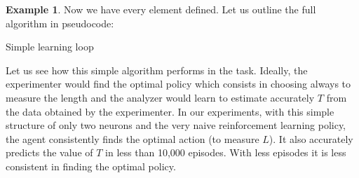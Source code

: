 \documentclass[11pt,a4paper,twoside]{report}
\DeclareMathOperator*{\argmax}{arg\,max}
\newcommand{\+}{\textnormal{+} }
\theoremstyle{definition}
\newtheorem{myex}[mythm]{Example}
\numberwithin{equation}{chapter}
\begin{document}
\begin{myex}
Now we have every element defined. Let us outline the full algorithm in 
pseudocode:

  \makeatletter
  \def\BState{\State\hskip-\ALG@thistlm}
  \makeatother
  \begin{algorithm}
    \caption{Simple learning loop}\label{pendulum}
    \end{algorithm}
\end{myex}

Let us see how this simple algorithm performs in the task. Ideally, the
experimenter would find the optimal policy which consists in choosing always to
measure the length and the analyzer would learn to estimate accurately $T$ from
the data obtained by the experimenter. In our experiments, with this simple
structure of only two neurons and the very naive reinforcement learning policy,
the agent consistently finds the optimal action (to measure $L$). It also
accurately predicts the value of $T$ in less than 10,000 episodes. With less
episodes it is less consistent in finding the optimal policy.
\end{document}
